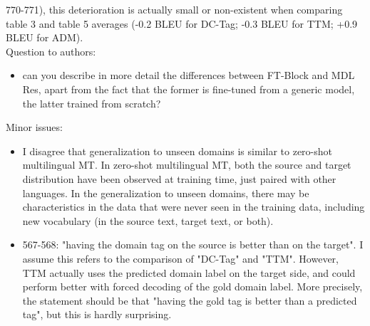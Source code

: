 \documentclass[12pt,times,a4paper,twoside]{article}
\begin{document}
770-771), this deterioration is actually small or non-existent when
comparing table 3 and table 5 averages (-0.2 BLEU for DC-Tag; -0.3 BLEU for TTM; +0.9 BLEU for ADM). \\

\noindent Question to authors:
\begin{itemize}
\item can you describe in more detail the differences between FT-Block and MDL Res, apart from the fact that the former is fine-tuned from a generic model, the latter trained from scratch?  
\end{itemize}

\noindent Minor issues:
\begin{itemize}
\item I disagree that generalization to unseen domains is similar to zero-shot multilingual MT. In zero-shot multilingual MT, both the source and target distribution have been observed at training time, just paired with other languages. In the generalization to unseen domains, there may be characteristics in the data that were never seen in the training data, including new vocabulary (in the source text, target text, or both).
\item 567-568: "having the domain tag on the source is better than on the target". I assume this refers to the comparison of "DC-Tag" and "TTM". However, TTM actually uses the predicted domain label on the target side, and could perform better with forced decoding of the gold domain label. More precisely, the statement should be that "having the gold tag is better than a predicted tag", but this is hardly surprising.
\end{itemize}
\end{document}
